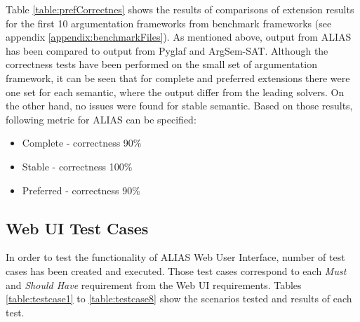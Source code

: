 Table \ref{table:prefCorrectnes} shows the results of comparisons of extension results for the first 10 argumentation frameworks from benchmark frameworks (see appendix \ref{appendix:benchmarkFiles}). As mentioned above, output from ALIAS has been compared to output from Pyglaf and ArgSem-SAT. Although the correctness tests have been performed on the small set of argumentation framework, it can be seen that for complete and preferred extensions there were one set for each semantic, where the output differ from the leading solvers. On the other hand, no issues were found for stable semantic. Based on those results, following metric for ALIAS can be specified:
\begin{itemize}
	\item Complete - correctness 90\%
	\item Stable - correctness 100\%
	\item Preferred - correctness 90\%
\end{itemize}


\subsection{Web UI Test Cases} \label{section:testCases}
In order to test the functionality of ALIAS Web User Interface, number of test cases has been created and executed. Those test cases correspond to each \textit{Must} and \textit{Should Have} requirement from the Web UI requirements. Tables \ref{table:testcase1} to \ref{table:testcase8} show the scenarios tested and results of each test.

